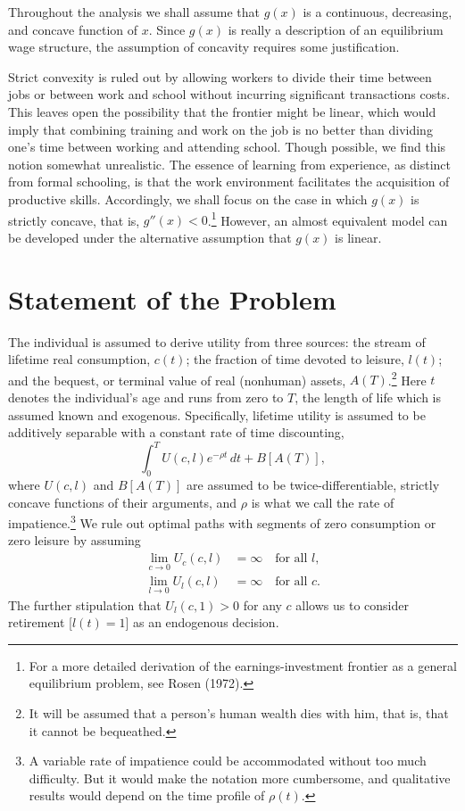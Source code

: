 \documentclass[11pt,fleqn]{article}
\begin{document}
Throughout the analysis we shall assume that $g(x)$ is a continuous, decreasing, and concave function of $x$. Since $g(x)$ is really a description of an equilibrium wage structure, the assumption of concavity requires some justification.

Strict convexity is ruled out by allowing workers to divide their time between jobs or between work and school without incurring significant transactions costs. This leaves open the possibility that the frontier might be linear, which would imply that combining training and work on the job is no better than dividing one's time between working and attending school. Though possible, we find this notion somewhat unrealistic. The essence of learning from experience, as distinct from formal schooling, is that the work environment facilitates the acquisition of productive skills. Accordingly, we shall focus on the case in which $g(x)$ is strictly concave, that is, $g''(x) < 0$.\footnote{For a more detailed derivation of the earnings-investment frontier as a general equilibrium problem, see Rosen (1972).} However, an almost equivalent model can be developed under the alternative assumption that $g(x)$ is linear.

\section{Statement of the Problem}

The individual is assumed to derive utility from three sources: the stream of lifetime real consumption, $c(t)$; the fraction of time devoted to leisure, $l(t)$; and the bequest, or terminal value of real (nonhuman) assets, $A(T)$.\footnote{It will be assumed that a person's human wealth dies with him, that is, that it cannot be bequeathed.} Here $t$ denotes the individual's age and runs from zero to $T$, the length of life which is assumed known and exogenous. Specifically, lifetime utility is assumed to be additively separable with a constant rate of time discounting,
\begin{equation}
\int_{0}^{T} U(c, l)e^{-\rho t} \, dt + B[A(T)],
\end{equation}
where $U(c, l)$ and $B[A(T)]$ are assumed to be twice-differentiable, strictly concave functions of their arguments, and $\rho$ is what we call the rate of impatience.\footnote{A variable rate of impatience could be accommodated without too much difficulty. But it would make the notation more cumbersome, and qualitative results would depend on the time profile of $\rho(t)$.} We rule out optimal paths with segments of zero consumption or zero leisure by assuming
\begin{align*}
\lim_{c \to 0} U_c(c, l) &= \infty \quad \text{for all } l, \\
\lim_{l \to 0} U_l(c, l) &= \infty \quad \text{for all } c.
\end{align*}
The further stipulation that $U_l(c, 1) > 0$ for any $c$ allows us to consider retirement [$l(t) = 1$] as an endogenous decision.
\end{document}
